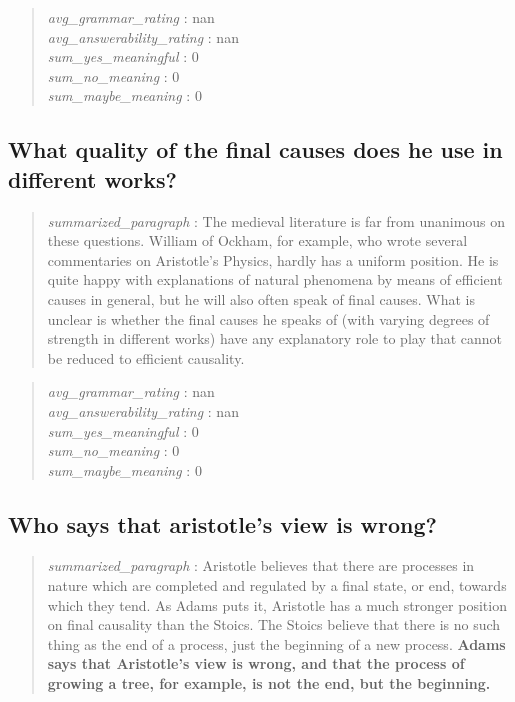 \begin{quote}
\emph{avg\_grammar\_rating} : nan\\
\emph{avg\_answerability\_rating} : nan\\
\emph{sum\_yes\_meaningful} : 0\\
\emph{sum\_no\_meaning} : 0\\
\emph{sum\_maybe\_meaning} : 0
\end{quote}

\hypertarget{what-quality-of-the-final-causes-does-he-use-in-different-works}{%
\subsection{What quality of the final causes does he use in different
works?}\label{what-quality-of-the-final-causes-does-he-use-in-different-works}}

\begin{quote}
\emph{summarized\_paragraph} : The medieval literature is far from
unanimous on these questions. William of Ockham, for example, who wrote
several commentaries on Aristotle's Physics, hardly has a uniform
position. He is quite happy with explanations of natural phenomena by
means of efficient causes in general, but he will also often speak of
final causes. What is unclear is whether the final causes he speaks of
(with varying degrees of strength in different works) have any
explanatory role to play that cannot be reduced to efficient causality.
\end{quote}

\begin{quote}
\emph{avg\_grammar\_rating} : nan\\
\emph{avg\_answerability\_rating} : nan\\
\emph{sum\_yes\_meaningful} : 0\\
\emph{sum\_no\_meaning} : 0\\
\emph{sum\_maybe\_meaning} : 0
\end{quote}

\hypertarget{who-says-that-aristotles-view-is-wrong}{%
\subsection{Who says that aristotle's view is
wrong?}\label{who-says-that-aristotles-view-is-wrong}}

\begin{quote}
\emph{summarized\_paragraph} : Aristotle believes that there are
processes in nature which are completed and regulated by a final state,
or end, towards which they tend. As Adams puts it, Aristotle has a much
stronger position on final causality than the Stoics. The Stoics believe
that there is no such thing as the end of a process, just the beginning
of a new process. \textbf{Adams says that Aristotle's view is wrong, and
that the process of growing a tree, for example, is not the end, but the
beginning.}
\end{quote}

